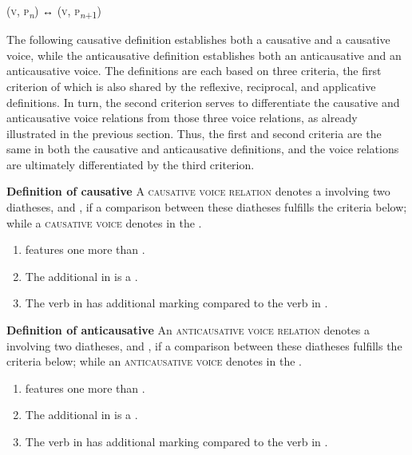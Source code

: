 \ea
	 (\textsc{v}, \textsc{p}\textsubscript{\textit{n}}) ↔  (\textsc{v}, \textsc{p}\textsubscript{\textit{n}+1})
\z

The following causative definition establishes both a causative  and a causative voice, while the anticausative definition establishes both an anticausative  and an anticausative voice. The definitions are each based on three criteria, the first criterion of which is also shared by the reflexive, reciprocal, and applicative definitions. In turn, the second criterion serves to differentiate the causative and anticausative voice relations from those three voice relations, as already illustrated in the previous section. Thus, the first and second criteria are the same in both the causative and anticausative definitions, and the voice relations are ultimately differentiated by the third criterion.

\eanoraggedright
		\textbf{Definition of causative} \newline
		A \textsc{causative voice relation} denotes a  involving two diatheses,  and , if a comparison between these diatheses fulfills the criteria below; while a \textsc{causative voice} denotes  in the .
		\begin{enumerate}[label=\roman*)]
			\item {} features one  more than .
			\item The additional  in  is a .
			\item The verb in  has additional marking compared to the verb in .
		\end{enumerate}
\z

\newpage
\eanoraggedright
		\textbf{Definition of anticausative} \newline
		An \textsc{anticausative voice relation} denotes a  involving two diatheses,  and , if a comparison between these diatheses fulfills the criteria below; while an \textsc{anticausative voice} denotes  in the .
		\begin{enumerate}[label=\roman*)]
			\item {} features one  more than .
			\item The additional  in  is a .
			\item The verb in  has additional marking compared to the verb in .
		\end{enumerate}
\z


